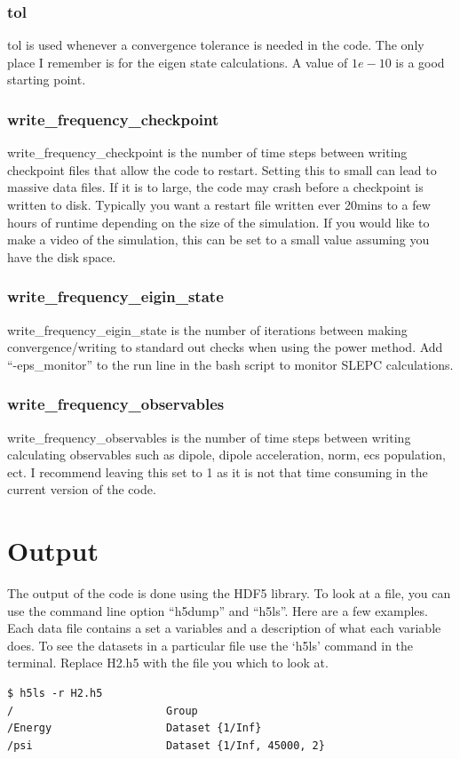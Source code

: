 \documentclass{article}
\begin{document}
\subsubsection{tol}
tol is used whenever a convergence tolerance is needed in the code. The only place I remember is for the eigen state calculations. A value of $1e-10$ is a good starting point.

\subsubsection{write\_frequency\_checkpoint}
write\_frequency\_checkpoint is the number of time steps between writing checkpoint files that allow the code to restart. Setting this to small can lead to massive data files. If it is to large, the code may crash before a checkpoint is written to disk. Typically you want a restart file written ever 20mins to a few hours of runtime depending on the size of the simulation. If you would like to make a video of the simulation, this can be set to a small value assuming you have the disk space.

\subsubsection{write\_frequency\_eigin\_state}
write\_frequency\_eigin\_state is the number of iterations between making convergence/writing to standard out checks when using the power method. Add ``-eps\_monitor'' to the run line in the bash script to monitor SLEPC calculations.

\subsubsection{write\_frequency\_observables}
write\_frequency\_observables is the number of time steps between writing calculating observables such as dipole, dipole acceleration, norm, ecs population, ect. I recommend leaving this set to 1 as it is not that time consuming in the current version of the code.


\section{Output} %
\label{sec:output}
The output of the code is done using the HDF5 library. To look at a file, you can use the command line option ``h5dump'' and ``h5ls''. Here are a few examples. Each data file contains a set a variables and a description of what each variable does. To see the datasets in a particular file use the `h5ls' command in the terminal. Replace H2.h5 with the file you which to look at.
\begin{verbatim}
$ h5ls -r H2.h5
/                        Group
/Energy                  Dataset {1/Inf}
/psi                     Dataset {1/Inf, 45000, 2}
\end{verbatim}
\end{document}

